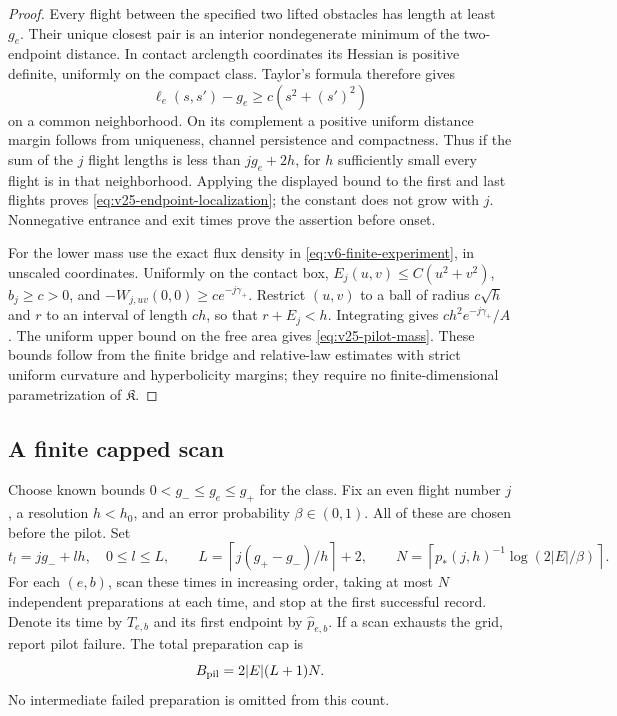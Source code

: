 \begin{proof}
Every flight between the specified two lifted obstacles has length at least
\(g_e\).  Their unique closest pair is an interior nondegenerate minimum
of the two-endpoint distance.  In contact arclength coordinates its Hessian
is positive definite, uniformly on the compact class.  Taylor's formula
therefore gives
\[
 \ell_e(s,s')-g_e\ge c(s^2+(s')^2)
\]
on a common neighborhood.  On its complement a positive uniform distance
margin follows from uniqueness, channel persistence and compactness.  Thus
if the sum of the \(j\) flight lengths is less than \(jg_e+2h\), for
\(h\) sufficiently small every flight is in that neighborhood.  Applying
the displayed bound to the first and last flights proves
\eqref{eq:v25-endpoint-localization}; the constant does not grow with \(j\).
Nonnegative entrance and exit times prove the assertion before onset.

For the lower mass use the exact flux density in
\eqref{eq:v6-finite-experiment}, in unscaled coordinates.  Uniformly on the
contact box, \(E_j(u,v)\le C(u^2+v^2)\), \(b_j\ge c>0\), and
\(-W_{j,uv}(0,0)\ge c e^{-j\gamma_+}\).  Restrict \((u,v)\) to a ball
of radius \(c\sqrt h\) and \(r\) to an interval of length \(ch\), so
that \(r+E_j<h\).  Integrating gives \(ch^2e^{-j\gamma_+}/A\).
The uniform upper bound on the free area gives
\eqref{eq:v25-pilot-mass}.  These bounds follow from the finite bridge and
relative-law estimates with strict uniform curvature and hyperbolicity
margins; they require no finite-dimensional parametrization of
\(\mathfrak K\).
\end{proof}

\subsection{A finite capped scan}

Choose known bounds \(0<g_-\le g_e\le g_+\) for the class.  Fix an even
flight number \(j\), a resolution \(h<h_0\), and an error probability
\(\beta\in(0,1)\).  All of these are chosen before the pilot.  Set
\begin{equation}\label{eq:v25-pilot-grid}
 t_l=jg_-+lh,\quad 0\le l\le L,
 \qquad L=\left\lceil j(g_+-g_-)/h\right\rceil+2,
 \qquad
 N=\left\lceil p_*(j,h)^{-1}\log(2|E|/\beta)\right\rceil.
\end{equation}
For each \((e,b)\), scan these times in increasing order, taking at most
\(N\) independent preparations at each time, and stop at the first
successful record.  Denote its time by \(T_{e,b}\) and its first endpoint
by \(\widehat p_{e,b}\).  If a scan exhausts the grid, report pilot failure.
The total preparation cap is
\begin{equation}\label{eq:v25-pilot-cap}
                          B_{\rm pil}=2|E|(L+1)N.
\end{equation}
No intermediate failed preparation is omitted from this count.

